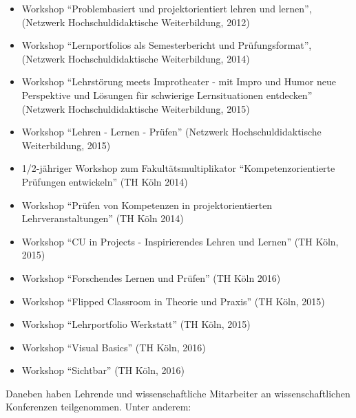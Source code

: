 \begin{itemize}
\tightlist
\item
  Workshop ``Problembasiert und projektorientiert lehren und lernen'',
  (Netzwerk Hochschuldidaktische Weiterbildung, 2012)
\item
  Workshop ``Lernportfolios als Semesterbericht und Prüfungsformat'',
  (Netzwerk Hochschuldidaktische Weiterbildung, 2014)
\item
  Workshop ``Lehrstörung meets Improtheater - mit Impro und Humor neue
  Perspektive und Lösungen für schwierige Lernsituationen entdecken''
  (Netzwerk Hochschuldidaktische Weiterbildung, 2015)
\item
  Workshop ``Lehren - Lernen - Prüfen'' (Netzwerk Hochschuldidaktische
  Weiterbildung, 2015)
\item
  1/2-jähriger Workshop zum Fakultätsmultiplikator
  ``Kompetenzorientierte Prüfungen entwickeln'' (TH Köln 2014)
\item
  Workshop ``Prüfen von Kompetenzen in projektorientierten
  Lehrveranstaltungen'' (TH Köln 2014)
\item
  Workshop ``CU in Projects - Inspirierendes Lehren und Lernen'' (TH
  Köln, 2015)
\item
  Workshop ``Forschendes Lernen und Prüfen'' (TH Köln 2016)
\item
  Workshop ``Flipped Classroom in Theorie und Praxis'' (TH Köln, 2015)
\item
  Workshop ``Lehrportfolio Werkstatt'' (TH Köln, 2015)
\item
  Workshop ``Visual Basics'' (TH Köln, 2016)
\item
  Workshop ``Sichtbar'' (TH Köln, 2016)
\end{itemize}

Daneben haben Lehrende und wissenschaftliche Mitarbeiter an
wissenschaftlichen Konferenzen teilgenommen. Unter anderem:

